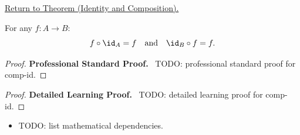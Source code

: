 \newpage
{}
\label{prf:comp-id}

\begin{remark*}[Return]
\hyperref[thm:comp-id]{Return to Theorem (Identity and Composition).}
\end{remark*}

\begin{theorem*}
For any $f : A \to B$:
\[
f \circ \id_A = f
\quad\text{and}\quad
\id_B \circ f = f.
\]
\end{theorem*}

\begin{proof}
\textbf{Professional Standard Proof.}~
TODO: professional standard proof for comp-id.
\end{proof}

\begin{proof}
\textbf{Detailed Learning Proof.}~
TODO: detailed learning proof for comp-id.
\end{proof}

\begin{remark*}
\end{remark*}

\begin{dependencies}
\begin{itemize}
  \item TODO: list mathematical dependencies.
\end{itemize}
\end{dependencies}

\clearpage
